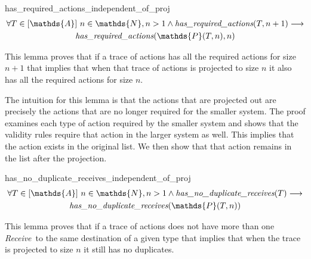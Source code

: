 \documentclass[runningheads]{llncs}
\newcommand{\receive}{\emph{Receive}}
\newcommand{\action}{\mathds{A}}
\newcommand{\listaction}{[\action]}
\newcommand{\projectsize}[2]{\mathds{P}(#1, #2)}
\newcommand{\hra}[2]{\emph{has\_required\_actions}(#1, #2)}
\newcommand{\hndr}[1]{\emph{has\_no\_duplicate\_receives}(#1)}
\begin{document}

\begin{lemma}{has\_required\_actions\_independent\_of\_proj}
\begin{multline*}
\forall T \in \listaction\ n \in \mathds{N}, n > 1 \wedge \hra{T}{n+1} \longrightarrow \\
\hra{\projectsize{T}{n}}{n}
\end{multline*}
\end{lemma}


This lemma proves that if a trace of actions has all the required actions for size $n+1$ that implies that when that trace of actions is projected to size $n$ it also has all the required actions for size $n$. 

The intuition for this lemma is that the actions that are projected out are precisely the actions that are no longer required for the smaller system. The proof examines each type of action required by the smaller system and shows that the validity rules require that action in the larger system as well. This implies that the action exists in the original list. We then show that that action remains in the list after the projection.

\begin{lemma}{has\_no\_duplicate\_receives\_independent\_of\_proj}
\begin{multline*}
\forall T \in \listaction\ n \in \mathds{N}, n > 1 \wedge \hndr{T} \longrightarrow \\
\hndr{\projectsize{T}{n}}
\end{multline*}
\end{lemma}
This lemma proves that if a trace of actions does not have more than one \receive\ to the same destination of a given type that implies that when the trace is projected to size $n$ it still has no duplicates.
\end{document}
